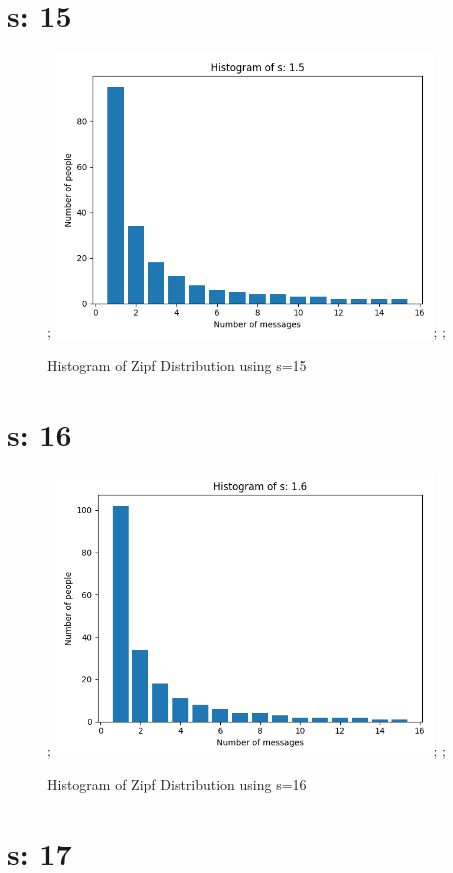 \documentclass{article}
\begin{document}
\section{s: 15}
\begin{figure}[H] \centering; \includegraphics[width=10cm]{imgs/histogram-15.png}; \label{fig:hist-15}; \caption{Histogram of Zipf Distribution using s=15} \end{figure}


\section{s: 16}

\begin{figure}[H] \centering; \includegraphics[width=10cm]{imgs/histogram-16.png}; \label{fig:hist-16}; \caption{Histogram of Zipf Distribution using s=16} \end{figure}


\section{s: 17}
\end{document}
